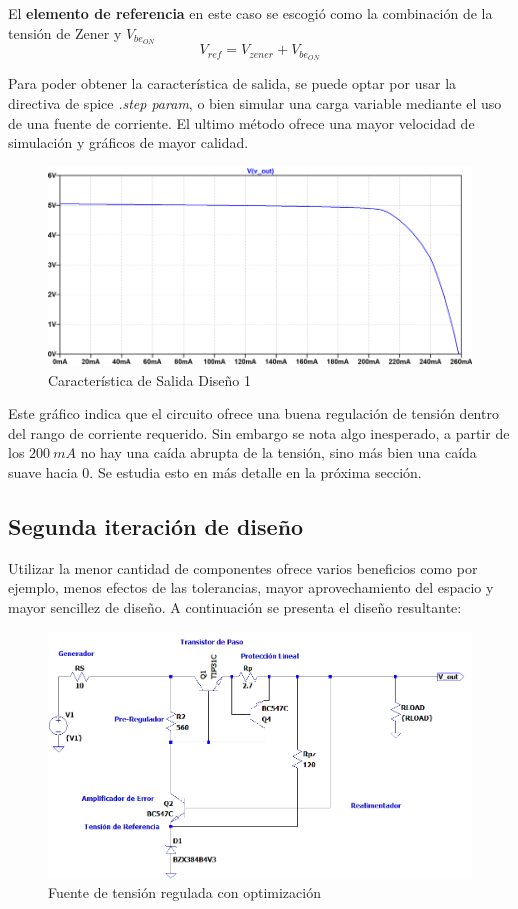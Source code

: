 El \textbf{elemento de referencia} en este caso se escogió como la combinación de la tensión de Zener y $V_{be_{ON}}$
\begin{equation}
	V_{ref} = V_{zener} + V_{be_{ON}}
\end{equation}

Para poder obtener la característica de salida, se puede optar por usar la directiva de spice \textit{.step param}, o bien simular una carga variable mediante el uso de una fuente de corriente. El ultimo método ofrece una mayor velocidad de simulación y gráficos de mayor calidad.

\begin{figure}[H]
	\centering
	\includegraphics[width=0.7\linewidth]{ImagenesEjercicio1/CaracteristicaDeSalidaConGrillaFV}
	\caption{Característica de Salida Diseño 1}
	\label{fig:caracteristicadesalidacongrillafv}
\end{figure}

Este gráfico indica que el circuito ofrece una buena regulación de tensión dentro del rango de corriente requerido. Sin embargo se nota algo inesperado, a partir de los $200 \ mA$ no hay una caída abrupta de la tensión, sino más bien una caída suave hacia 0. Se estudia esto en más detalle en la próxima sección.

\subsection{Segunda iteración de diseño}
Utilizar la menor cantidad de componentes ofrece varios beneficios como por ejemplo, menos efectos de las tolerancias, mayor aprovechamiento del espacio y mayor sencillez de diseño. A continuación se presenta el diseño resultante:
\begin{figure}[H]
	\centering
	\includegraphics[width=0.7\linewidth]{ImagenesEjercicio1/ImagenCircuitoFLcasiPelada.PNG}
	\caption{Fuente de tensión regulada con optimización}
	\label{fig:imagencircuitofl}
\end{figure}


